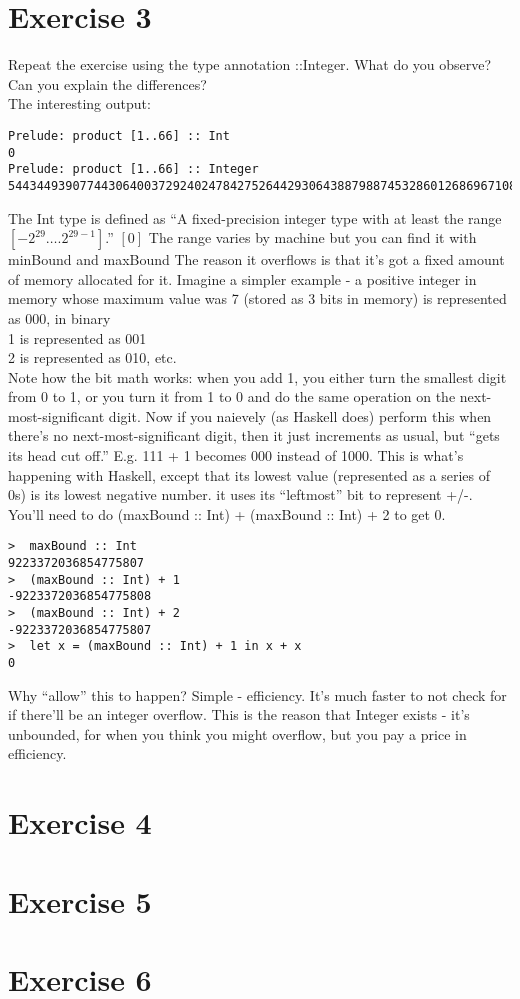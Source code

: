 \documentclass{article}
\begin{document}
\section*{Exercise 3}
Repeat the exercise using the type annotation ::Integer. What do you observe? Can you explain the differences?\\
\newline
The interesting output:
\begin{lstlisting}
Prelude: product [1..66] :: Int
0
Prelude: product [1..66] :: Integer
544344939077443064003729240247842752644293064388798874532860126869671081148416000000000000000
\end{lstlisting}
The Int type is defined as ``A fixed-precision integer type with at least the range $[-2^{29} \dots. 2^{29-1}]$.'' $[0]$ The range varies by machine but you can find it with minBound and maxBound
\newline
The reason it overflows is that it's got a fixed amount of memory allocated for it. Imagine a simpler example - a positive integer in memory whose maximum value was 7 (stored as 3 bits in memory)
\newline
{} is represented as 000, in binary\\
1 is represented as 001\\
2 is represented as 010, etc.\\
\newline
Note how the bit math works: when you add 1, you either turn the smallest digit from 0 to 1, or you turn it from 1 to 0 and do the same operation on the next-most-significant digit.
\newline
\newline
Now if you naievely (as Haskell does) perform this when there's no next-most-significant digit, then it just increments as usual, but ``gets its head cut off.'' E.g. 111 + 1 becomes 000 instead of 1000. This is what's happening with Haskell, except that its lowest value (represented as a series of 0s) is its lowest negative number. it uses its ``leftmost'' bit to represent +/-. You'll need to do (maxBound :: Int) + (maxBound :: Int) + 2 to get 0.
\begin{lstlisting}
>  maxBound :: Int
9223372036854775807
>  (maxBound :: Int) + 1
-9223372036854775808
>  (maxBound :: Int) + 2
-9223372036854775807
>  let x = (maxBound :: Int) + 1 in x + x
0
\end{lstlisting}
Why ``allow'' this to happen? Simple - efficiency. It's much faster to not check for if there'll be an integer overflow. This is the reason that Integer exists - it's unbounded, for when you think you might overflow, but you pay a price in efficiency.


\section*{Exercise 4}


\section*{Exercise 5}


\section*{Exercise 6}
\end{document}
